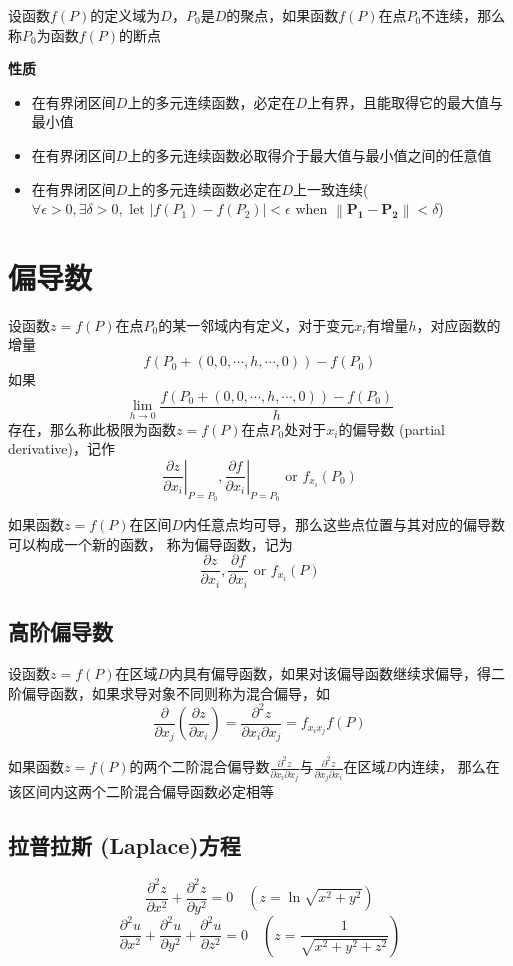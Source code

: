\documentclass[UTF8]{ctexart}
\newcommand{\ve}[1]{{\bm{#1}}}
\newcommand{\when}[2]{{\left.{#1}\right|_{#2}}}
\newcommand{\dist}[2]{{\left\|\ve{#1}-\ve{#2}\right\|}}
\begin{document}
设函数$f(P)$的定义域为$D$，$P_0$是$D$的聚点，如果函数$f(P)$在点$P_0$不连续，那么称$P_0$为函数$f(P)$的断点

{\bf 性质}
\begin{itemize}
  \item 在有界闭区间$D$上的多元连续函数，必定在$D$上有界，且能取得它的最大值与最小值
  \item 在有界闭区间$D$上的多元连续函数必取得介于最大值与最小值之间的任意值
  \item 在有界闭区间$D$上的多元连续函数必定在$D$上一致连续($\forall \epsilon>0,\exists \delta>0,\text{ let }|f(P_1)-f(P_2)|<\epsilon\text{ when }\dist{P_1}{P_2}<\delta$)
\end{itemize}
\bigskip
\bigskip

\section*{偏导数}

\bigskip

设函数$z=f(P)$在点$P_0$的某一邻域内有定义，对于变元$x_i$有增量$h$，对应函数的增量
\[f(P_0+(0,0,\cdots,h,\cdots,0))-f(P_0)\]
如果
\[ \lim_{h\to0}\frac{f(P_0+(0,0,\cdots,h,\cdots,0))-f(P_0)}{h} \]
存在，那么称此极限为函数$z=f(P)$在点$P_0$处对于$x_i$的偏导数 (partial derivative)，记作
\[\when{\frac{\partial z}{\partial x_i}}{P=P_0},\when{\frac{\partial f}{\partial x_i}}{P=P_0}\text{ or }f_{x_i}(P_0)\]

如果函数$z=f(P)$在区间$D$内任意点均可导，那么这些点位置与其对应的偏导数可以构成一个新的函数，
称为偏导函数，记为
\[\frac{\partial z}{\partial x_i},\frac{\partial f}{\partial x_i}\text{ or }f_{x_i}(P)\]

\subsection*{高阶偏导数}
设函数$z=f(P)$在区域$D$内具有偏导函数，如果对该偏导函数继续求偏导，得二阶偏导函数，如果求导对象不同则称为混合偏导，如
\[ \frac{\partial}{\partial x_j}\left(\frac{\partial z}{\partial x_i}\right)=\frac{\partial^2z}{\partial x_i \partial x_j}=f_{x_ix_j}f(P) \]

如果函数$z=f(P)$的两个二阶混合偏导数$\frac{\partial^2z}{\partial x_i \partial x_j}$与$\frac{\partial^2z}{\partial x_j \partial x_i}$在区域$D$内连续，
那么在该区间内这两个二阶混合偏导函数必定相等

\subsection*{拉普拉斯 (Laplace)方程}
\[\frac{\partial^2z}{\partial x^2}+\frac{\partial^2z}{\partial y^2}=0\quad(z=\ln\sqrt{x^2+y^2})\]
\[\frac{\partial^2u}{\partial x^2}+\frac{\partial^2u}{\partial y^2}+\frac{\partial^2u}{\partial z^2}=0\quad\left(z=\frac{1}{\sqrt{x^2+y^2+z^2}}\right)\]
\bigskip
\bigskip
\end{document}
